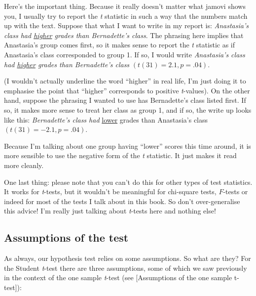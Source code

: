 \documentclass[
  a4paper,
]{book}
\begin{document}
Here's the important thing. Because it really doesn't matter what jamovi
shows you, I usually try to report the \emph{t} statistic in such a way
that the numbers match up with the text. Suppose that what I want to
write in my report is: \emph{Anastasia's class had \ul{higher} grades
than Bernadette's class}. The phrasing here implies that Anastasia's
group comes first, so it makes sense to report the \emph{t} statistic as
if Anastasia's class corresponded to group 1. If so, I would write
\emph{Anastasia's class had \ul{higher} grades than Bernadette's class}
\((t(31) = 2.1, p = .04)\).

(I wouldn't actually underline the word ``higher'' in real life, I'm
just doing it to emphasise the point that ``higher'' corresponds to
positive \emph{t}-values). On the other hand, suppose the phrasing I
wanted to use has Bernadette's class listed first. If so, it makes more
sense to treat her class as group 1, and if so, the write up looks like
this: \emph{Bernadette's class had} \ul{lower} grades than Anastasia's
class \((t(31) = -2.1, p = .04)\).

Because I'm talking about one group having ``lower'' scores this time
around, it is more sensible to use the negative form of the \emph{t}
statistic. It just makes it read more cleanly.

One last thing: please note that you can't do this for other types of
test statistics. It works for \emph{t}-tests, but it wouldn't be
meaningful for chi-square tests, \(F\)-tests or indeed for most of the
tests I talk about in this book. So don't over-generalise this advice!
I'm really just talking about \emph{t}-tests here and nothing else!

\hypertarget{assumptions-of-the-test}{%
\subsection{Assumptions of the test}\label{assumptions-of-the-test}}

As always, our hypothesis test relies on some assumptions. So what are
they? For the Student \emph{t}-test there are three assumptions, some of
which we saw previously in the context of the one sample \emph{t}-test
(see {[}Assumptions of the one sample t-test{]}):
\end{document}
